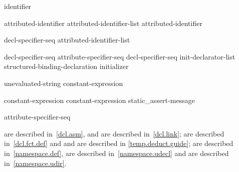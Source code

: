 \begin{bnf}
\br
    identifier 
\end{bnf}

\begin{bnf}
\br
    attributed-identifier\br
    attributed-identifier-list \terminal{,} attributed-identifier
\end{bnf}

\begin{bnf}
\br
     decl-specifier-seq  \terminal{[} attributed-identifier-list \terminal{]}
\end{bnf}

\begin{bnf}
\br
    decl-specifier-seq  \terminal{;}\br
    attribute-specifier-seq decl-specifier-seq init-declarator-list \terminal{;}\br
    structured-binding-declaration initializer \terminal{;}
\end{bnf}

\begin{bnf}
\br
  unevaluated-string\br
  constant-expression
\end{bnf}

\begin{bnf}
\br
   \terminal{(} constant-expression \terminal{)} \terminal{;}\br
   \terminal{(} constant-expression \terminal{,} static_assert-message \terminal{)} \terminal{;}
\end{bnf}

\begin{bnf}
\br
    \terminal{;}
\end{bnf}

\begin{bnf}
\br
    attribute-specifier-seq \terminal{;}
\end{bnf}

\begin{note}
 are described in~\ref{dcl.asm}, and
 are described in~\ref{dcl.link};
 are described in~\ref{dcl.fct.def} and
 and
 are described in \ref{temp.deduct.guide};
 are described in~\ref{namespace.def},
 are described in~\ref{namespace.udecl} and
 are described in~\ref{namespace.udir}.
\end{note}

